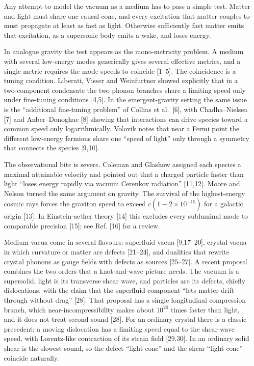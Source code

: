 \documentclass[
  11pt,
]{article}
\begin{document}
Any attempt to model the vacuum as a medium has to pass a simple test.
Matter and light must share one causal cone, and every excitation that
matter couples to must propagate at least as fast as light. Otherwise
sufficiently fast matter emits that excitation, as a supersonic body
emits a wake, and loses energy.

In analogue gravity the test appears as the mono-metricity problem. A
medium with several low-energy modes generically gives several effective
metrics, and a single metric requires the mode speeds to coincide
{[}1--5{]}. The coincidence is a tuning condition. Liberati, Visser and
Weinfurtner showed explicitly that in a two-component condensate the two
phonon branches share a limiting speed only under fine-tuning conditions
{[}4,5{]}. In the emergent-gravity setting the same issue is the
``additional fine-tuning problem'' of Collins et al.~{[}6{]}, with
Chadha--Nielsen {[}7{]} and Anber--Donoghue {[}8{]} showing that
interactions can drive species toward a common speed only
logarithmically. Volovik notes that near a Fermi point the different
low-energy fermions share one ``speed of light'' only through a symmetry
that connects the species {[}9,10{]}.

The observational bite is severe. Coleman and Glashow assigned each
species a maximal attainable velocity and pointed out that a charged
particle faster than light ``loses energy rapidly via vacuum Cerenkov
radiation'' {[}11,12{]}. Moore and Nelson turned the same argument on
gravity. The survival of the highest-energy cosmic rays forces the
graviton speed to exceed \(c(1-2\times10^{-15})\) for a galactic origin
{[}13{]}. In Einstein-aether theory {[}14{]} this excludes every
subluminal mode to comparable precision {[}15{]}; see Ref. {[}16{]} for
a review.

Medium vacua come in several flavours: superfluid vacua {[}9,17--20{]},
crystal vacua in which curvature or matter are defects {[}21--24{]}, and
dualities that rewrite crystal phonons as gauge fields with defects as
sources {[}25--27{]}. A recent proposal combines the two orders that a
knot-and-wave picture needs. The vacuum is a supersolid, light is its
transverse shear wave, and particles are its defects, chiefly
dislocations, with the claim that the superfluid component ``lets matter
drift through without drag'' {[}28{]}. That proposal has a single
longitudinal compression branch, which near-incompressibility makes
about \(10^{20}\) times faster than light, and it does not treat second
sound {[}28{]}. For an ordinary crystal there is a classic precedent: a
moving dislocation has a limiting speed equal to the shear-wave speed,
with Lorentz-like contraction of its strain field {[}29,30{]}. In an
ordinary solid shear is the slowest sound, so the defect ``light cone''
and the shear ``light cone'' coincide naturally.
\end{document}

